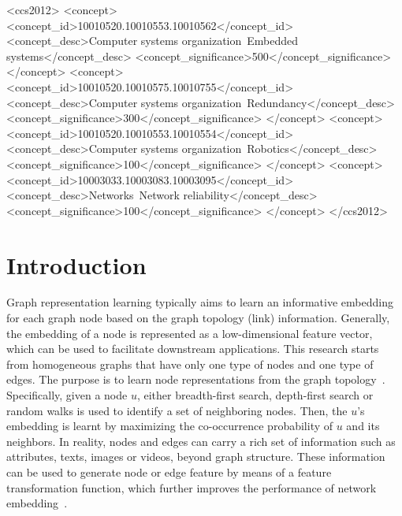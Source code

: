 \documentclass[sigconf]{acmart}
\begin{document}
\begin{CCSXML}
<ccs2012>
 <concept>
  <concept_id>10010520.10010553.10010562</concept_id>
  <concept_desc>Computer systems organization~Embedded systems</concept_desc>
  <concept_significance>500</concept_significance>
 </concept>
 <concept>
  <concept_id>10010520.10010575.10010755</concept_id>
  <concept_desc>Computer systems organization~Redundancy</concept_desc>
  <concept_significance>300</concept_significance>
 </concept>
 <concept>
  <concept_id>10010520.10010553.10010554</concept_id>
  <concept_desc>Computer systems organization~Robotics</concept_desc>
  <concept_significance>100</concept_significance>
 </concept>
 <concept>
  <concept_id>10003033.10003083.10003095</concept_id>
  <concept_desc>Networks~Network reliability</concept_desc>
  <concept_significance>100</concept_significance>
 </concept>
</ccs2012>
\end{CCSXML}



\maketitle
\pagestyle{plain}

\section{Introduction}
\label{sec:intro}
Graph representation learning typically aims to learn an   informative embedding for each graph node based on the graph topology (link) information.
Generally, the embedding of a node is represented as a low-dimensional feature vector, which can be used to facilitate downstream applications.
This research starts from homogeneous graphs that have only one type of nodes and one type of edges. The purpose is to learn node representations from the graph topology~\cite{grover2016node2vec, perozzi2014deepwalk, dai2016discriminative}.
Specifically, given a node $u$,  either breadth-first search, depth-first search or random walks is used to identify a set of neighboring nodes. Then, the $u$'s embedding is learnt by maximizing the co-occurrence probability of $u$ and its neighbors.
In reality, nodes and edges can carry a rich set of information such as attributes, texts, images or videos, beyond graph structure.
These information can be used to generate node or edge feature by means of a feature transformation function, which  further improves the performance of network embedding~\cite{liao2018attributed}.
\end{document}
